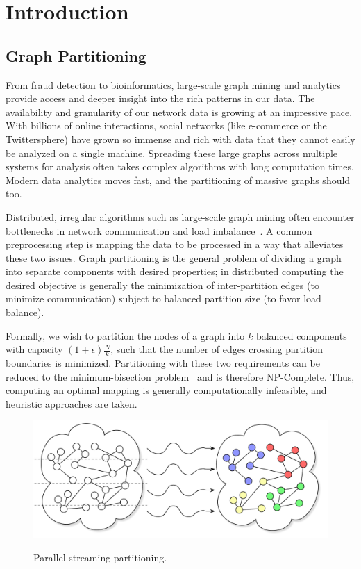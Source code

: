 \section{Introduction}
\subsection{Graph Partitioning}
From fraud detection to bioinformatics, large-scale graph mining and analytics provide access and deeper insight into the rich patterns in our data.
The availability and granularity of our network data is growing at an impressive pace.
With billions of online interactions, social networks (like e-commerce or the Twittersphere) have grown so immense and rich with data that they cannot easily be analyzed on a single machine.
Spreading these large graphs across multiple systems for analysis often takes complex algorithms with long computation times.
Modern data analytics moves fast, and the partitioning of massive graphs should too.

Distributed, irregular algorithms such as large-scale graph mining often encounter bottlenecks in network communication and load imbalance~\cite{challenglums}. 
A common preprocessing step is mapping the data to be processed in a way that alleviates these two issues.
Graph partitioning is the general problem of dividing a graph into separate components with desired properties; in distributed computing the desired objective is generally the minimization of inter-partition edges (to minimize communication) subject to balanced partition size (to favor load balance).

Formally, we wish to partition the nodes of a graph into $k$ balanced components with capacity $(1+\epsilon)\frac{N}{k}$, such that the number of edges crossing partition boundaries is minimized. Partitioning with these two requirements can be reduced to the minimum-bisection problem~\cite{Garey:1979:CIG:578533} and is therefore NP-Complete. 
Thus, computing an optimal mapping is generally computationally infeasible, and heuristic approaches are taken. 

\begin{figure}[ht]
\centering
  \includegraphics[width=0.7\columnwidth]{figures/coverfig.pdf}
  \label{fig:coverfig}
  \caption{Parallel streaming partitioning.}
\end{figure}

